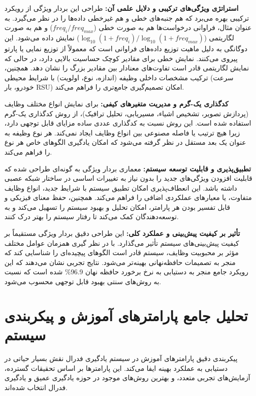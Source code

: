 \documentclass[11pt]{article}
\begin{document}
\textbf{استراتژی ویژگی‌های ترکیبی و دلایل علمی آن:} طراحی این بردار ویژگی از رویکرد ترکیبی بهره می‌برد که هم جنبه‌های خطی و هم غیرخطی داده‌ها را در نظر می‌گیرد. به عنوان مثال، فراوانی درخواست‌ها هم به صورت خطی ($freq_i / freq_{max}$) و هم به صورت لگاریتمی ($\log_{10}(1 + freq_i) / \log_{10}(1 + freq_{max})$) نمایش داده می‌شود. این دوگانگی به دلیل ماهیت توزیع داده‌های فراوانی است که معمولاً از توزیع نمایی یا پارتو پیروی می‌کنند. نمایش خطی برای مقادیر کوچک حساسیت بالایی دارد، در حالی که نمایش لگاریتمی قادر است تفاوت‌های معنادار بین مقادیر بزرگ را نشان دهد. همچنین، ترکیب مشخصات داخلی وظیفه (اندازه، نوع، اولویت) با شرایط محیطی (سرعت خودرو، بار RSU) امکان تصمیم‌گیری جامع‌تری را فراهم می‌کند.

\textbf{کدگذاری یک-گرم و مدیریت متغیرهای کیفی:} برای نمایش انواع مختلف وظایف (پردازش تصویر، تشخیص اشیاء، مسیریابی، تحلیل ترافیک)، از روش کدگذاری یک-گرم استفاده شده است. این روش نسبت به کدگذاری عددی ساده مزایای قابل توجهی دارد، زیرا هیچ ترتیب یا فاصله مصنوعی بین انواع وظایف ایجاد نمی‌کند. هر نوع وظیفه به عنوان یک بعد مستقل در نظر گرفته می‌شود که امکان یادگیری الگوهای خاص هر نوع را فراهم می‌کند.

\textbf{تطبیق‌پذیری و قابلیت توسعه سیستم:} معماری بردار ویژگی به گونه‌ای طراحی شده که قابلیت افزودن ویژگی‌های جدید را بدون نیاز به تغییرات اساسی در ساختار شبکه عصبی داشته باشد. این انعطاف‌پذیری امکان تطبیق سیستم با شرایط جدید، انواع وظایف متفاوت، یا معیارهای عملکردی اضافی را فراهم می‌کند. همچنین، حفظ معنای فیزیکی و قابل تفسیر بودن هر پارامتر، امکان تحلیل و بهبود سیستم را تسهیل می‌کند و به توسعه‌دهندگان کمک می‌کند تا رفتار سیستم را بهتر درک کنند.

\textbf{تأثیر بر کیفیت پیش‌بینی و عملکرد کلی:} این طراحی دقیق بردار ویژگی مستقیماً بر کیفیت پیش‌بینی‌های سیستم تأثیر می‌گذارد. با در نظر گیری همزمان عوامل مختلف مؤثر بر محبوبیت وظایف، سیستم قادر است الگوهای پیچیده‌ای را شناسایی کند که منجر به تصمیمات حافظه‌نهانی بهینه‌تر می‌شود. نتایج تجربی نشان می‌دهند که این رویکرد جامع منجر به دستیابی به نرخ برخورد حافظه نهان 96.9\% شده است که نسبت به روش‌های سنتی بهبود قابل توجهی محسوب می‌شود.

\section{تحلیل جامع پارامترهای آموزش و پیکربندی سیستم}

پیکربندی دقیق پارامترهای آموزش در سیستم یادگیری فدرال نقش بسیار حیاتی در دستیابی به عملکرد بهینه ایفا می‌کند. این پارامترها بر اساس تحقیقات گسترده، آزمایش‌های تجربی متعدد، و بهترین روش‌های موجود در حوزه یادگیری عمیق و یادگیری فدرال انتخاب شده‌اند.
\end{document}
